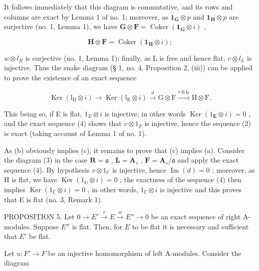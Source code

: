It follows immediately that this diagram is commutative, and its rows and columns are exact by Lemma 1 of no. 1; moreover, as \(\mathbf{1}_{\mathbf{G}} \otimes p\) and \(\mathbf{1}_{\mathbf{H}} \otimes p\) are surjective (no. 1, Lemma 1), we have \(\mathbf{G} \otimes \mathbf{F} = \operatorname{Coker}(\mathbf{1}_{\mathbf{G}} \otimes i)\) ,

\[
\mathbf {H} \otimes \mathbf {F} = \operatorname{Coker} (\mathbf {1} _ {\mathbf {H}} \otimes i);
\]

\(w \otimes l_{R}\) is surjective (no. 1, Lemma 1); finally, as L is free and hence flat, \(v \otimes l_{L}\) is injective. Thus the snake diagram (§ 1, no. 4, Proposition 2, (iii)) can be applied to prove the existence of an exact sequence

\[
\operatorname{Ker} \left(\mathrm{l} _ {\mathrm{H}} \otimes i\right) \longrightarrow \operatorname{Ker} \left(\mathrm{l} _ {\mathrm{E}} \otimes i\right) \xrightarrow {d} \mathrm{G} \otimes \mathrm{F} \xrightarrow {v \otimes \mathrm{l} _ {\mathrm{F}}} \mathrm{H} \otimes \mathrm{F}.\tag{4}
\]

This being so, if E is flat, \(1_{E} \otimes i\) is injective, in other words \(\operatorname{Ker}(1_{\mathbf{E}} \otimes i) = 0\) , and the exact sequence (4) shows that \(v \otimes 1_{F}\) is injective, hence the sequence (2) is exact (taking account of Lemma 1 of no. 1).

As (b) obviously implies (c), it remains to prove that (c) implies (a). Consider the diagram (3) in the case \(\mathbf{R} = \mathfrak{a}\) , \(\mathbf{L} = \mathbf{A}_s\) , \(\mathbf{F} = \mathbf{A}_s / \mathfrak{a}\) and apply the exact sequence (4). By hypothesis \(v \otimes 1_{\mathbb{F}}\) is injective, hence \(\operatorname{Im}(d) = 0\) ; moreover, as H is flat, we have \(\operatorname{Ker}(1_{\mathbb{H}} \otimes i) = 0\) ; the exactness of the sequence (4) then implies \(\operatorname{Ker}(1_{\mathbb{E}} \otimes i) = 0\) , in other words, \(1_{\mathbb{E}} \otimes i\) is injective and this proves that E is flat (no. 3, Remark 1).

PROPOSITION 5. Let \(0 \to E' \xrightarrow{v} E \xrightarrow{w} E'' \to 0\) be an exact sequence of right A-modules. Suppose \(E''\) is flat. Then, for \(E\) to be flat it is necessary and sufficient that \(E'\) be flat.

Let \(u: F' \to F\) be an injective homomorphism of left A-modules. Consider the diagram

